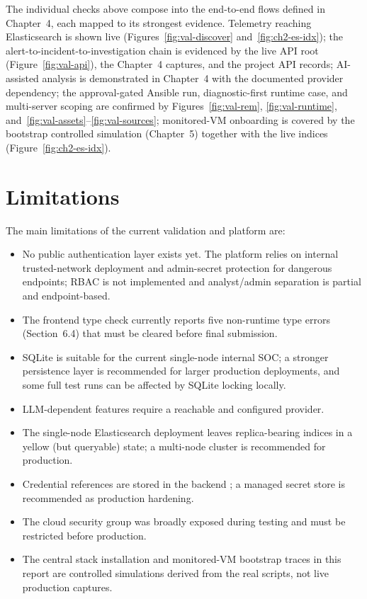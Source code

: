 The individual checks above compose into the end-to-end flows defined in Chapter~4, each mapped to its strongest evidence. Telemetry reaching Elasticsearch is shown live (Figures~\ref{fig:val-discover} and~\ref{fig:ch2-es-idx}); the alert-to-incident-to-investigation chain is evidenced by the live API root (Figure~\ref{fig:val-api}), the Chapter~4 captures, and the project API records; AI-assisted analysis is demonstrated in Chapter~4 with the documented provider dependency; the approval-gated Ansible run, diagnostic-first runtime case, and multi-server scoping are confirmed by Figures~\ref{fig:val-rem}, \ref{fig:val-runtime}, and~\ref{fig:val-assets}--\ref{fig:val-sources}; monitored-VM onboarding is covered by the bootstrap controlled simulation (Chapter~5) together with the live  indices (Figure~\ref{fig:ch2-es-idx}).

\section{Limitations}
\label{sec:val-limits}

The main limitations of the current validation and platform are:

\begin{itemize}[leftmargin=1cm]
\item No public authentication layer exists yet. The platform relies on internal trusted-network deployment and admin-secret protection for dangerous endpoints; RBAC is not implemented and analyst/admin separation is partial and endpoint-based.
\item The frontend type check currently reports five non-runtime type errors (Section~6.4) that must be cleared before final submission.
\item SQLite is suitable for the current single-node internal SOC; a stronger persistence layer is recommended for larger production deployments, and some full test runs can be affected by SQLite locking locally.
\item LLM-dependent features require a reachable and configured provider.
\item The single-node Elasticsearch deployment leaves replica-bearing indices in a yellow (but queryable) state; a multi-node cluster is recommended for production.
\item Credential references are stored in the backend ; a managed secret store is recommended as production hardening.
\item The cloud security group was broadly exposed during testing and must be restricted before production.
\item The central stack installation and monitored-VM bootstrap traces in this report are controlled simulations derived from the real scripts, not live production captures.
\end{itemize}

